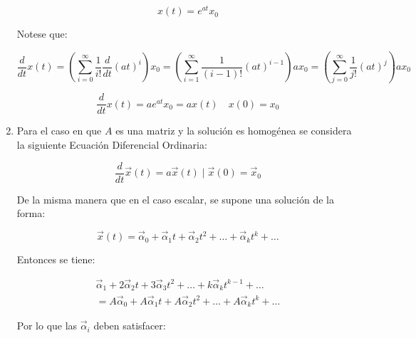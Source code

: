 \begin{enumerate}
        \begin{equation}
            x(t) = e^{at} x_0
        \end{equation}

        Notese que:

        \begin{equation*}
            \frac{d}{dt} x(t) = \left( \sum\limits_{i=0}^{\infty} \frac{1}{i!} \frac{d}{dt} (at)^i \right) x_{0} = \left( \sum\limits_{i=1}^{\infty} \frac{1}{(i-1)!} (at)^{i-1} \right) a x_{0} = \left( \sum\limits_{j=0}^{\infty} \frac{1}{j!} (at)^j \right) a x_{0}
        \end{equation*}

        \begin{equation*}
            \frac{d}{dt} x(t) = a e^{at} x_{0} = a x(t) \quad x(0) = x_{0}
        \end{equation*}

    \item Para el caso en que $A$ es una matriz y la solución es homogénea se considera la siguiente Ecuación Diferencial Ordinaria:

        \begin{equation}
            \frac{d}{dt} \vec{x}(t) = a \vec{x}(t) \mid \vec{x}(0) = \vec{x}_0
        \end{equation}

        De la misma manera que en el caso escalar, se supone una solución de la forma:

        \begin{equation}
            \vec{x}(t) = \vec{\alpha}_0 + \vec{\alpha}_1 t + \vec{\alpha}_2 t^2 + \dots + \vec{\alpha}_k t^k + \dots
        \end{equation}

        Entonces se tiene:

        \begin{multline}
            \vec{\alpha}_1 + 2 \vec{\alpha}_2 t + 3 \vec{\alpha}_3 t^2 + \dots + k \vec{\alpha}_k t^{k-1} + \dots \\ = A \vec{\alpha}_0 + A \vec{\alpha}_1 t + A \vec{\alpha}_2 t^2 + \dots + A \vec{\alpha}_k t^k + \dots \nonumber
        \end{multline}

        Por lo que las $\vec{\alpha}_i$ deben satisfacer:


\end{enumerate}
